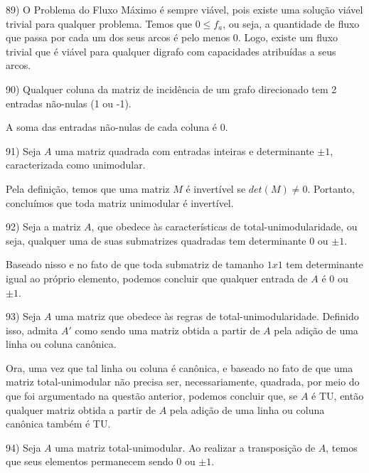 \documentclass[]{article}
\begin{document}
89) O Problema do Fluxo Máximo é sempre viável, pois existe uma solução viável trivial para qualquer problema. Temos que $0 \leq f_a$, ou seja, a quantidade de fluxo que passa por cada um dos seus arcos é pelo menos 0. Logo, existe um fluxo trivial que é viável para qualquer digrafo com capacidades atribuídas a seus arcos.

\vspace{0.5cm}

90) Qualquer coluna da matriz de incidência de um grafo direcionado tem 2 entradas não-nulas (1 ou -1).

A soma das entradas não-nulas de cada coluna é 0.

\vspace{0.5cm}

91) Seja $A$ uma matriz quadrada com entradas inteiras e determinante $\pm 1$, caracterizada como unimodular.

Pela definição, temos que uma matriz $M$ é invertível se $det(M) \neq 0$. Portanto, concluímos que toda matriz unimodular é invertível.

\vspace{0.5cm}

92) Seja a matriz $A$, que obedece às características de total-unimodularidade, ou seja, qualquer uma de suas submatrizes quadradas tem determinante 0 ou $\pm 1$. 

Baseado nisso e no fato de que toda submatriz de tamanho $1x1$ tem determinante igual ao próprio elemento, podemos concluir que qualquer entrada de $A$ é 0 ou $\pm 1$.

\vspace{0.5cm}

93) Seja $A$ uma matriz que obedece às regras de total-unimodularidade. Definido isso, admita $A'$ como sendo uma matriz obtida a partir de $A$ pela adição de uma linha ou coluna canônica.

Ora, uma vez que tal linha ou coluna é canônica, e baseado no fato de que uma matriz total-unimodular não precisa ser, necessariamente, quadrada, por meio do que foi argumentado na questão anterior, podemos concluir que, se $A$ é TU, então qualquer matriz obtida a partir de $A$ pela adição de uma linha ou coluna canônica também é TU.

\vspace{0.5cm}

94) Seja $A$ uma matriz total-unimodular. Ao realizar a transposição de $A$, temos que seus elementos permanecem sendo 0 ou $\pm 1$. 
\end{document}
